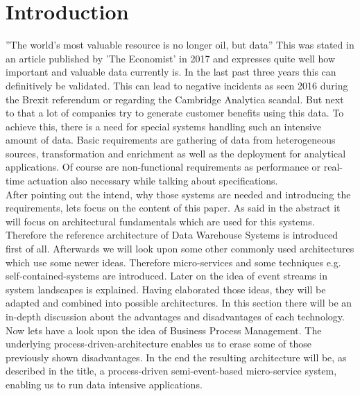 \section{Introduction}
''The world’s most valuable resource is no longer oil, but data'' \cite{dataIsOil}\newline
This was stated in an article published by 'The Economist' in 2017 and expresses quite well how important and valuable data currently is. In the last past three years this can definitively be validated. This can lead to negative incidents as seen 2016 during the Brexit referendum or regarding the Cambridge Analytica scandal. But next to that a lot of companies try to generate customer benefits using this data.\newline
To achieve this, there is a need for special systems handling such an intensive amount of data. Basic requirements are gathering of data from heterogeneous sources, transformation and enrichment as well as the deployment for analytical applications. Of course are non-functional requirements as performance or real-time actuation also necessary while talking about specifications.\newline
\\
After pointing out the intend, why those systems are needed and introducing the requirements, lets focus on the content of this paper.\newline 
As said in the abstract it will focus on architectural fundamentals which are used for this systems. Therefore the reference architecture of Data Warehouse Systems is introduced first of all. Afterwards we will look upon some other commonly used architectures which use some newer ideas.\newline
Therefore micro-services and some techniques e.g. self-contained-systems are introduced. Later on the idea of event streams in system landscapes is explained.\newline
Having elaborated those ideas, they will be adapted and combined into possible architectures. In this section there will be an in-depth discussion about the advantages and disadvantages of each technology.\newline
Now lets have a look upon the idea of Business Process Management. The underlying process-driven-architecture enables us to erase some of those previously shown disadvantages. In the end the resulting architecture will be, as described in the title, a process-driven semi-event-based micro-service system, enabling us to run data intensive applications. 